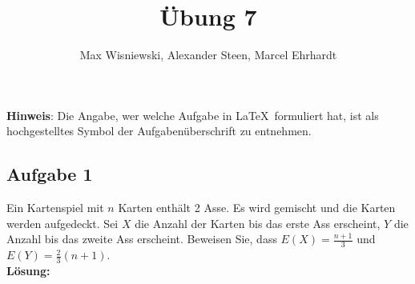 \documentclass[11pt,a4paper,ngerman]{article}
\date{}
\title{Übung 7}
\author{Max Wisniewski\maxw, Alexander Steen\alex, Marcel Ehrhardt\marcel}
\begin{document}

\renewcommand{\figurename}{Figure}

\maketitle
\thispagestyle{fancy}

\begin{center}
\textbf{Hinweis}: Die Angabe, wer welche Aufgabe in \LaTeX\ formuliert hat, ist als hochgestelltes Symbol der Aufgabenüberschrift zu entnehmen.
\end{center}


\subsection*{Aufgabe 1}

Ein Kartenspiel mit $n$ Karten enthält 2 Asse. Es wird gemischt und die Karten werden aufgedeckt. Sei $X$ die Anzahl der Karten
bis das erste Ass erscheint, $Y$ die Anzahl bis das zweite Ass erscheint. Beweisen Sie, dass $E(X) = \frac{n+1}{3}$ und $E(Y) = \frac{2}{3}(n+1)$.\\

\textbf{Lösung:}\\
\end{document}
